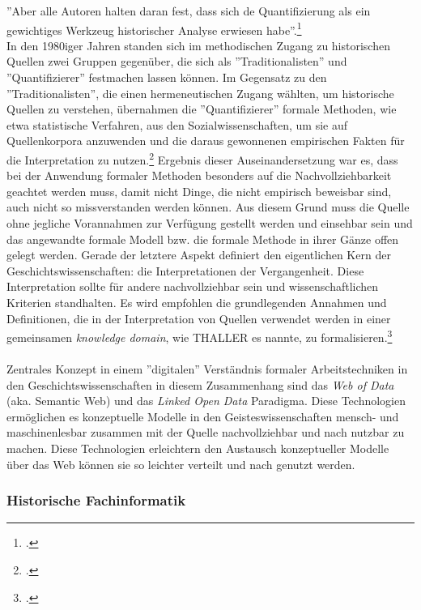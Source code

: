 \documentclass[12pt,a4paper]{article}
\begin{document}
''Aber alle Autoren halten daran fest, dass sich de Quantifizierung als ein gewichtiges Werkzeug historischer Analyse erwiesen habe''.\footcite[][S.191-206]{jarausch1985quantitative}
\\
In den 1980iger Jahren standen sich im methodischen Zugang zu historischen Quellen zwei Gruppen gegenüber, die sich als ''Traditionalisten'' und ''Quantifizierer'' festmachen lassen können. Im Gegensatz zu den ''Traditionalisten'', die einen hermeneutischen Zugang wählten, um historische Quellen zu verstehen, übernahmen die ''Quantifizierer'' formale Methoden, wie etwa statistische Verfahren, aus den Sozialwissenschaften, um sie auf Quellenkorpora anzuwenden und die daraus gewonnenen empirischen Fakten für die Interpretation zu nutzen.\footcite[][S.XX-XX]{jarausch1985quantitative} Ergebnis dieser Auseinandersetzung war es, dass bei der Anwendung formaler Methoden besonders auf die Nachvollziehbarkeit geachtet werden muss, damit nicht Dinge, die nicht empirisch beweisbar sind, auch nicht so missverstanden werden können. Aus diesem Grund muss die Quelle ohne jegliche Vorannahmen zur Verfügung gestellt werden und einsehbar sein und das angewandte formale Modell bzw. die formale Methode in ihrer Gänze offen gelegt werden. Gerade der letztere Aspekt definiert den eigentlichen Kern der Geschichtswissenschaften: die Interpretationen der Vergangenheit. Diese Interpretation sollte für andere nachvollziehbar sein und wissenschaftlichen Kriterien standhalten. Es wird empfohlen die grundlegenden Annahmen und Definitionen, die in der Interpretation von Quellen verwendet werden in einer gemeinsamen \textit{knowledge domain}, wie THALLER es nannte, zu formalisieren.\footcite[][S.XX-XX]{thaller2017historical}
\\ 
\\
Zentrales Konzept in einem ''digitalen'' Verständnis formaler Arbeitstechniken in den Geschichtswissenschaften in diesem Zusammenhang sind das \textit{Web of Data} (aka. Semantic Web) und das \textit{Linked Open Data} Paradigma. Diese Technologien ermöglichen es konzeptuelle Modelle in den Geisteswissenschaften mensch- und maschinenlesbar zusammen mit der Quelle nachvollziehbar und nach nutzbar zu machen. Diese Technologien erleichtern den Austausch konzeptueller Modelle über das Web können sie so leichter verteilt und nach genutzt werden.

\subsubsection{Historische Fachinformatik}
\end{document}
